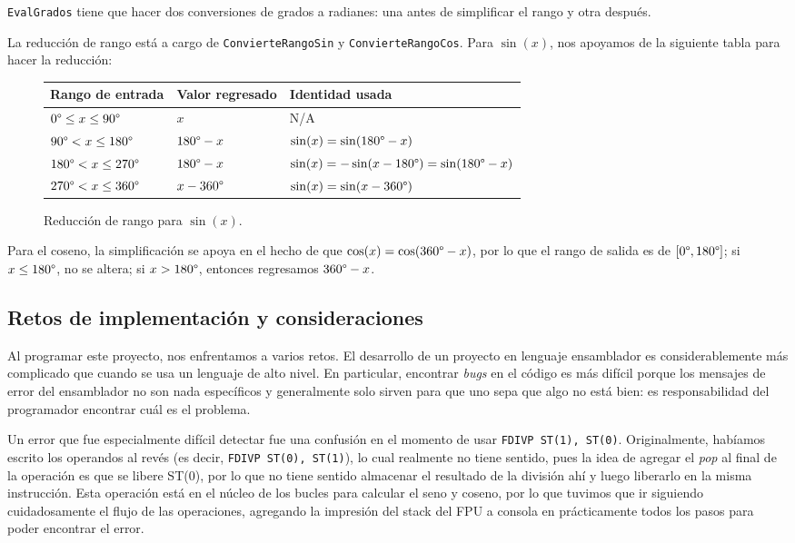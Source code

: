 \documentclass[12pt]{article}
\begin{document}
\texttt{EvalGrados} tiene que hacer dos conversiones de grados a radianes: una
antes de simplificar el rango y otra después.

La reducción de rango está a cargo de \texttt{ConvierteRangoSin} y
\texttt{ConvierteRangoCos}. Para $\sin(x)$, nos apoyamos de la siguiente tabla
para hacer la reducción:
\begin{figure}[H]
\centering
\begin{tabular}{l l l}
    Rango de entrada & Valor regresado & Identidad usada \\
    \hline \hline
    $0\degree \leq x \leq 90\degree$ & $x$ & N/A \\ \hline
    $90\degree < x \leq 180\degree$ & $180\degree - x$ & $\sin(x) = \sin(180\degree - x)$ \\ \hline
    $180\degree < x \leq 270\degree$ & $180\degree - x$ & $\sin(x) = - \sin(x - 180\degree) = \sin(180\degree - x)$ \\ \hline
    $270\degree < x \leq 360\degree$ & $x - 360\degree$ & $\sin(x) = \sin(x - 360\degree)$
\end{tabular}
\caption{Reducción de rango para $\sin(x)$.}
\label{tabla-rango}
\end{figure}

Para el coseno, la simplificación se apoya en el hecho de que $\cos(x) =
\cos(360\degree - x)$, por lo que el rango de salida es
de $[0\degree, 180\degree]$; si $x \leq 180\degree$, no se altera; si $x >
180\degree$, entonces regresamos $360\degree - x$.

\subsection{Retos de implementación y consideraciones}

Al programar este proyecto, nos enfrentamos a varios retos. El desarrollo de un
proyecto en lenguaje ensamblador es considerablemente más complicado que cuando
se usa un lenguaje de alto nivel. En particular, encontrar \textit{bugs} en el
código es más difícil porque los mensajes de error del ensamblador no son nada
específicos y generalmente solo sirven para que uno sepa que algo no está bien:
es responsabilidad del programador encontrar cuál es el problema.

Un error que fue especialmente difícil detectar fue una confusión en el momento
de usar \texttt{FDIVP ST(1), ST(0)}. Originalmente, habíamos escrito los
operandos al revés (es decir, \texttt{FDIVP ST(0), ST(1)}), lo cual realmente
no tiene sentido, pues la idea de agregar el \textit{pop} al final de la
operación es que se libere ST(0), por lo que no tiene sentido almacenar el
resultado de la división ahí y luego liberarlo en la misma instrucción. Esta
operación está en el núcleo de los bucles para calcular el seno y coseno, por
lo que tuvimos que ir siguiendo cuidadosamente el flujo de las operaciones,
agregando la impresión del stack del FPU a consola en prácticamente todos los
pasos para poder encontrar el error.
\end{document}
